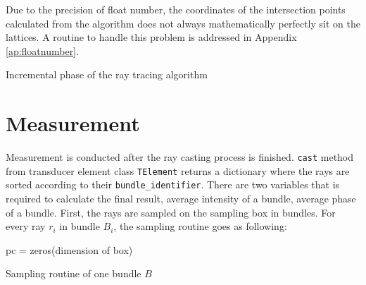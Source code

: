 Due to the precision of float number, the coordinates of the intersection points calculated from the algorithm does not always mathematically perfectly sit on the lattices. A routine to handle this problem is addressed in Appendix \ref{ap:floatnumber}.

\IncMargin{1em}
\begin{algorithm}[H] \label{algo:increment}
    \DontPrintSemicolon
    \caption{Incremental phase of the ray tracing algorithm}
\end{algorithm}
\DecMargin{1em}


\section{Measurement} \label{sec:measurement}
Measurement is conducted after the ray casting process is finished. \texttt{cast} method from transducer element class \texttt{TElement} returns a dictionary where the rays are sorted according to their \texttt{bundle\_identifier}. There are two variables that is required to calculate the final result, average intensity of a bundle, average phase of a bundle. First, the rays are sampled on the sampling box in bundles. For every ray $r_i$ in bundle $B_i$, the sampling routine goes as following:

\IncMargin{1em}
\begin{algorithm}[H] \label{algo:sampling}
    \DontPrintSemicolon
    pc = zeros(dimension of box)\;
    \caption{Sampling routine of one bundle $B$}
\end{algorithm}
\DecMargin{1em}

